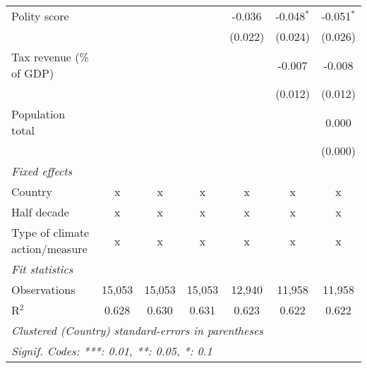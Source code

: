\begin{tabular}{lcccccc}
   Polity score                                                  &         &              &               & -0.036        & -0.048$^{*}$  & -0.051$^{*}$\\   
                                                                 &         &              &               & (0.022)       & (0.024)       & (0.026)\\   
   Tax revenue (\% of GDP)                                       &         &              &               &               & -0.007        & -0.008\\   
                                                                 &         &              &               &               & (0.012)       & (0.012)\\   
   Population total                                              &         &              &               &               &               & 0.000\\   
                                                                 &         &              &               &               &               & (0.000)\\   
   \emph{Fixed effects}\\
   Country                                                       & x       & x            & x             & x             & x             & x\\  
   Half decade                                                   & x       & x            & x             & x             & x             & x\\  
   Type of climate action/measure                                & x       & x            & x             & x             & x             & x\\  
   \midrule \emph{Fit statistics}\\
   Observations                                                  & 15,053  & 15,053       & 15,053        & 12,940        & 11,958        & 11,958\\  
   R$^2$                                                         & 0.628   & 0.630        & 0.631         & 0.623         & 0.622         & 0.622\\  
   \midrule
   \multicolumn{7}{l}{\emph{Clustered (Country) standard-errors in parentheses}}\\
   \multicolumn{7}{l}{\emph{Signif. Codes: ***: 0.01, **: 0.05, *: 0.1}}\\
\end{tabular}
\par\endgroup


